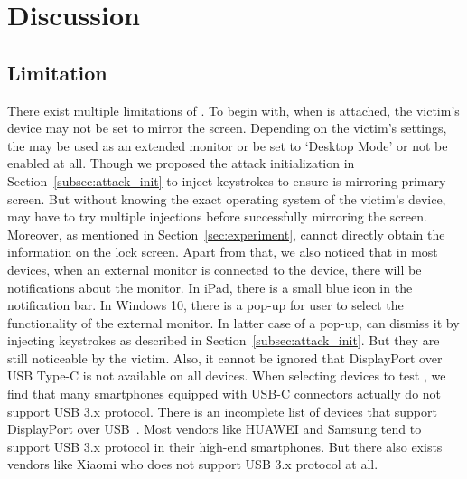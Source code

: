 \section{Discussion}
\label{sec:discussion}

\subsection{Limitation}
There exist multiple limitations of \tool. To begin with, when \tool is attached, the victim's device may not be set to mirror the screen.
Depending on the victim's settings, the \tool may be used as an extended monitor or be set to `Desktop Mode' or not be enabled at all. Though we proposed the attack initialization in Section~\ref{subsec:attack_init} to inject keystrokes to ensure \tool is mirroring primary screen. But without knowing the exact operating system of the victim's device, \tool may have to try multiple injections before successfully mirroring the screen.
Moreover, as mentioned in Section~\ref{sec:experiment}, \tool cannot directly obtain the information on the lock screen.
 Apart from that, we also noticed that in most devices, when an external monitor is connected to the device, there will be notifications about the monitor. In iPad, there is a small blue icon in the notification bar. In Windows 10, there is a pop-up for user to select the functionality of the external monitor. In latter case of a pop-up, \tool can dismiss it by injecting keystrokes as described in Section~\ref{subsec:attack_init}. But they are still noticeable by the victim. Also, it cannot be ignored that DisplayPort over USB Type-C is not available on all devices. When selecting devices to test \tool, we find that many smartphones equipped with USB-C connectors actually do not support \ac{USB} 3.x protocol. There is an incomplete list of devices that support DisplayPort over \ac{USB}~\cite{usbclist}. Most vendors like HUAWEI and Samsung tend to support \ac{USB} 3.x protocol in their \mbox{high-end} smartphones. But there also exists vendors like Xiaomi who does not support \ac{USB} 3.x protocol at all.

\begin{comment}
There exist multiple limitations of \tool.  To begin with, \tool can only gain
the information and control access of the host itself instead of external
hardware.  Consequently, as we introduced in the
Section~\ref{sec:countermeasures}, \tool can hardly bypass the defense
approaches that use external hardware for authorization.  Moreover, most of
the devices will prompt users to give authentication to the \ac{USB} devices or
select one of the functional modes after they are plugged in.  Though some of
such prompts are not conspicuous for non-experts, especially when \tool is
concealed within other functional hardware such as power banks \shuqing{If
there is experiment, add it here.}, the probability of whether users could get
aware that something unusual happens will increase with the existence of these
prompting messages.
\end{comment}
